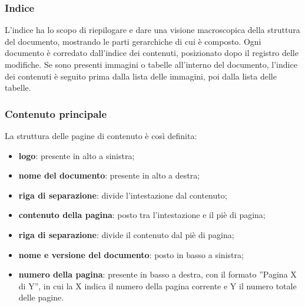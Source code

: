 \subsubsection{Indice}
L'indice ha lo scopo di riepilogare e dare una visione macroscopica della struttura del documento, mostrando le parti gerarchiche di cui è composto. Ogni documento è corredato dall'indice dei contenuti, posizionato dopo il registro delle modifiche. Se sono presenti immagini o tabelle all'interno del documento, l'indice dei contenuti è seguito prima dalla lista delle immagini, poi dalla lista delle tabelle.

\subsubsection{Contenuto principale}
La struttura delle pagine di contenuto è così definita: \begin{itemize}
\item \textbf{logo}: presente in alto a sinistra;
\item \textbf{nome del documento}: presente in alto a destra;
\item \textbf{riga di separazione}: divide l'intestazione dal contenuto;
\item \textbf{contenuto della pagina}: posto tra l'intestazione e il piè di pagina;
\item \textbf{riga di separazione}: divide il contenuto dal piè di pagina;
\item \textbf{nome e versione del documento}: posto in basso a sinistra;
\item \textbf{numero della pagina}: presente in basso a destra, con il formato ''Pagina X di Y'', in cui la X indica il numero della pagina corrente e Y il numero totale delle pagine.
\end{itemize}

